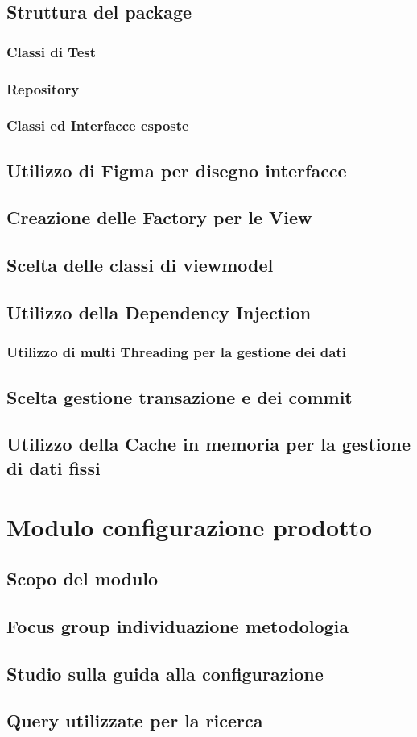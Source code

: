 \documentclass[12pt, a4paper]{article}
\begin{document}
\subsection{Struttura del package}
\subsubsection{Classi di Test}
\subsubsection{Repository}
\subsubsection{Classi ed Interfacce esposte}

\subsection{Utilizzo di Figma per disegno interfacce}
\subsection{Creazione delle Factory per le View}
\subsection{Scelta delle classi di viewmodel}

\subsection{Utilizzo della Dependency Injection}
\subsubsection{Utilizzo di multi Threading per la gestione dei dati}
\subsection{Scelta gestione transazione e dei commit}
\subsection{Utilizzo della Cache in memoria per la gestione di dati fissi}

\newpage
\section{Modulo configurazione prodotto}
\subsection{Scopo del modulo}
\subsection{Focus group individuazione metodologia}
\subsection{Studio sulla guida alla configurazione}
\subsection{Query utilizzate per la ricerca}



\end{document}
